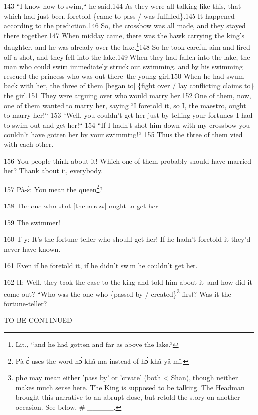 143 ``I know how to swim,`` he said.144 As they were all talking
like this, that which had just been foretold \{came to pass / was fulfilled\}.145
It happened according to the prediction.146 So, the crossbow was all made, and
they stayed there together.147 When midday came, there was the hawk carrying the
king's daughter, and he was already over the lake.\footnote{Lit., ``and he had gotten and far as above the lake.``}148 So he took careful aim
and fired off a shot, and they fell into the lake.149 When they had fallen into
the lake, the man who could swim immediately struck out swimming, and by his swimming
rescued the princess who was out there--the young girl.150 When he had swum back
with her, the three of them [began to] \{fight over / lay conflicting claims to\}
the girl.151 They were arguing over who would marry her.152 One of them, now, one
of them wanted to marry her, saying ``I foretold it, so I, the maestro,
ought to marry her!`` 153 ``Well, you couldn't get her just by
telling your fortunes--I had to swim out and get her!`` 154 ``If
I hadn't shot him down with my crossbow you couldn't have gotten her by your swimming!``
155 Thus the three of them vied with each other.

156 You people think about it! Which one of them probably should have married her?
Thank about it, everybody.

157 Pà-ɛ́: You mean the queen\footnote{Pà-ɛ́ uses the word hɔ́-khâ-ma instead of hɔ́-khâ yâ-mî.}?

158 The one who shot [the arrow] ought to get her.

159 The swimmer!

160 T-y: It's the fortune-teller who should get her! If he hadn't foretold it they'd
never have known.

161 Even if he foretold it, if he didn't swim he couldn't get her.

162 H: Well, they took the case to the king and told him about it--and how did
it come out? ``Who was the one who \{passed by / created\}\footnote{ph\emph{a} may mean either 'pass by' or 'create' (both < Shan), though neither makes much sense here. The King is supposed to be talking. The Headman brought this narrative to an abrupt close, but retold the story on another occasion. See below, \# \_\_\_\_\_.} first?
Was it the fortune-teller?

\begin{center}
TO BE CONTINUED
\end{center}

\leftskip=0pt

